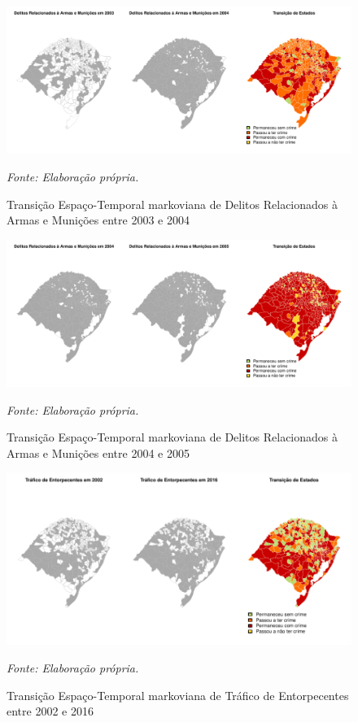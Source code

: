 \documentclass[12pt,openright,oneside,a4paper,english,french,spanish]{abntex2}
\numberwithin{table}{section} %
\numberwithin{figure}{section} %
\newcommand{\source}[1]{\textit{#1}}
\begin{document}
\begin{subappendices}
\begin{figure}[H]
\begin{center}
\includegraphics{TESE_DE_DOUTORADO_RENAN_FINAL-map_del_rel_armas_2003_2004}
\end{center}
\caption{Transição Espaço-Temporal markoviana de Delitos Relacionados à Armas e Munições entre 2003 e 2004}
\source{Fonte: Elaboração própria.}
\label{fig:mapas_del_rel_armas_markov_2003_2004}
\end{figure}

\begin{figure}[H]
\begin{center}
\includegraphics{TESE_DE_DOUTORADO_RENAN_FINAL-map_del_rel_armas_2004_2005}
\end{center}
\caption{Transição Espaço-Temporal markoviana de Delitos Relacionados à Armas e Munições entre 2004 e 2005}
\source{Fonte: Elaboração própria.}
\label{fig:mapas_del_rel_armas_markov_2004_2005}
\end{figure}

\begin{figure}[H]
\begin{center}
\includegraphics{TESE_DE_DOUTORADO_RENAN_FINAL-map_trafico_2002_2016}
\end{center}
\caption{Transição Espaço-Temporal markoviana de Tráfico de Entorpecentes entre 2002 e 2016}
\source{Fonte: Elaboração própria.}
\label{fig:mapas_trafico_markov_2002_2016}
\end{figure}


\end{subappendices}
\end{document}
